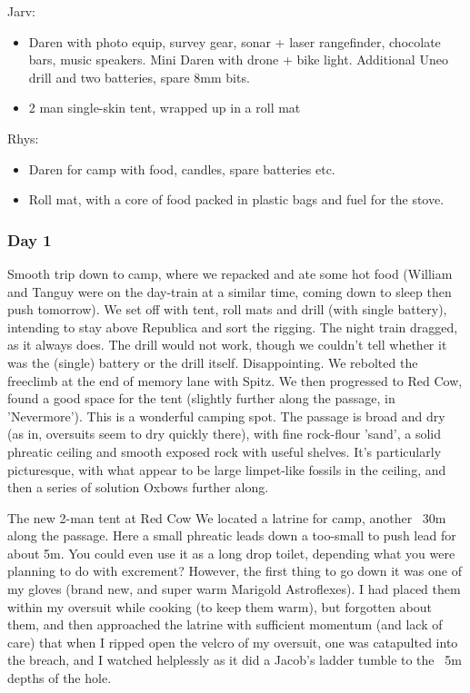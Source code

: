 \documentclass[onecolumn]{book}
\begin{document}
Jarv:
\begin{itemize}
\item Daren with photo equip, survey gear, sonar + laser rangefinder, chocolate bars, music speakers. Mini Daren with drone + bike light. Additional Uneo drill and two batteries, spare 8mm bits.
\item 2 man single-skin tent, wrapped up in a roll mat
\end{itemize}

Rhys:
\begin{itemize}
\item Daren for camp with food, candles, spare batteries etc.
\item Roll mat, with a core of food packed in plastic bags and fuel for the stove.
\end{itemize}


\subsubsection{Day 1}
Smooth trip down to camp, where we repacked and ate some hot food (William and Tanguy were on the day-train at a similar time, coming down to sleep then push tomorrow).
We set off with tent, roll mats and drill (with single battery), intending to stay above Republica and sort the rigging.
The night train dragged, as it always does. The drill would not work, though we couldn't tell whether it was the (single) battery or the drill itself. Disappointing. We rebolted the freeclimb at the end of memory lane with Spitz.
We then progressed to Red Cow, found a good space for the tent (slightly further along the passage, in 'Nevermore'). This is a wonderful camping spot. The passage is broad and dry (as in, oversuits seem to dry quickly there), with fine rock-flour 'sand', a solid phreatic ceiling and smooth exposed rock with useful shelves. It's particularly picturesque, with what appear to be large limpet-like fossils in the ceiling, and then a series of solution Oxbows further along.

The new 2-man tent at Red Cow
We located a latrine for camp, another ~30m along the passage. Here a small phreatic leads down a too-small to push lead for about 5m. You could even use it as a long drop toilet, depending what you were planning to do with excrement? However, the first thing to go down it was one of my gloves (brand new, and super warm Marigold Astroflexes). I had placed them within my oversuit while cooking (to keep them warm), but forgotten about them, and then approached the latrine with sufficient momentum (and lack of care) that when I ripped open the velcro of my oversuit, one was catapulted into the breach, and I watched helplessly as it did a Jacob's ladder tumble to the ~5m depths of the hole.
\end{document}
